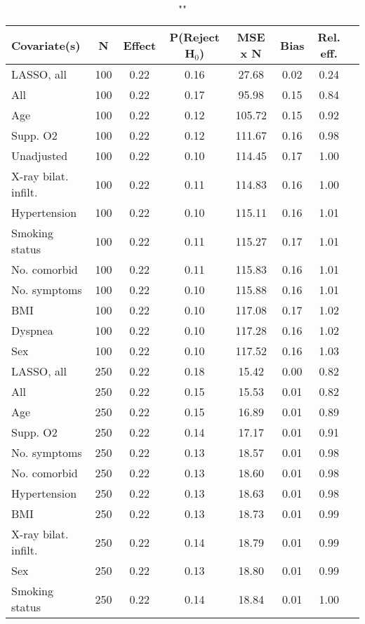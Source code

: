 \documentclass{article}
\begin{document}
{\tabcolsep=6pt  %
\begin{longtable}{lccccccc}
\caption{""} \\
Covariate(s) & N & Effect & P(Reject H$_0$) & MSE x N & Bias & Rel. eff.\\ \midrule
LASSO, all & 100 & 0.22 & 0.16 &  27.68 & 0.02 & 0.24 \\ 
All & 100 & 0.22 & 0.17 &  95.98 & 0.15 & 0.84 \\ 
Age & 100 & 0.22 & 0.12 & 105.72 & 0.15 & 0.92 \\ 
Supp. O2 & 100 & 0.22 & 0.12 & 111.67 & 0.16 & 0.98 \\ 
Unadjusted & 100 & 0.22 & 0.10 & 114.45 & 0.17 & 1.00 \\ 
X-ray bilat. infilt. & 100 & 0.22 & 0.11 & 114.83 & 0.16 & 1.00 \\ 
Hypertension & 100 & 0.22 & 0.10 & 115.11 & 0.16 & 1.01 \\ 
Smoking status & 100 & 0.22 & 0.11 & 115.27 & 0.17 & 1.01 \\ 
No. comorbid & 100 & 0.22 & 0.11 & 115.83 & 0.16 & 1.01 \\ 
No. symptoms & 100 & 0.22 & 0.10 & 115.88 & 0.16 & 1.01 \\ 
BMI & 100 & 0.22 & 0.10 & 117.08 & 0.17 & 1.02 \\ 
Dyspnea & 100 & 0.22 & 0.10 & 117.28 & 0.16 & 1.02 \\ 
Sex & 100 & 0.22 & 0.10 & 117.52 & 0.16 & 1.03 \\ \midrule 
LASSO, all & 250 & 0.22 & 0.18 &  15.42 & 0.00 & 0.82 \\ 
All & 250 & 0.22 & 0.15 &  15.53 & 0.01 & 0.82 \\ 
Age & 250 & 0.22 & 0.15 &  16.89 & 0.01 & 0.89 \\ 
Supp. O2 & 250 & 0.22 & 0.14 &  17.17 & 0.01 & 0.91 \\ 
No. symptoms & 250 & 0.22 & 0.13 &  18.57 & 0.01 & 0.98 \\ 
No. comorbid & 250 & 0.22 & 0.13 &  18.60 & 0.01 & 0.98 \\ 
Hypertension & 250 & 0.22 & 0.13 &  18.63 & 0.01 & 0.98 \\ 
BMI & 250 & 0.22 & 0.13 &  18.73 & 0.01 & 0.99 \\ 
X-ray bilat. infilt. & 250 & 0.22 & 0.14 &  18.79 & 0.01 & 0.99 \\ 
Sex & 250 & 0.22 & 0.13 &  18.80 & 0.01 & 0.99 \\ 
Smoking status & 250 & 0.22 & 0.14 &  18.84 & 0.01 & 1.00 \\ 

\end{longtable}}
\end{document}
